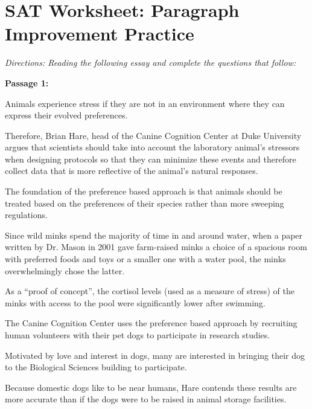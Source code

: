 \section{SAT Worksheet: Paragraph Improvement Practice}

\textit{Directions: Reading the following essay and complete the questions that follow:}

\bigskip
\textbf{Passage 1:}

\bigskip
\begin{inparaenum}[\bfseries 1]
\indent \item Animals experience stress if they are not in an environment where they can express their evolved preferences. \item Therefore, Brian Hare, head of the Canine Cognition Center at Duke University argues that scientists should take into account the laboratory animal's stressors when designing protocols so that they can minimize these events and therefore collect data that is more reflective of the animal's natural responses. \item The foundation of the preference based approach is that animals should be treated based on the preferences of their species rather than more sweeping regulations. \item Since wild minks spend the majority of time in and around water, when a paper written by Dr. Mason in 2001 gave farm-raised minks a choice of a spacious room with preferred foods and toys or a smaller one with a water pool, the minks overwhelmingly chose the latter. \item As a ``proof of concept'', the cortisol levels (used as a measure of stress) of the minks with access to the pool were significantly lower after swimming.

\indent \item The Canine Cognition Center uses the preference based approach by recruiting human volunteers with their pet dogs to participate in research studies. \item Motivated by love and interest in dogs, many are interested in bringing their dog to the Biological Sciences building to participate. \item Because domestic dogs like to be near humans, Hare contends these results are more accurate than if the dogs were to be raised in animal storage facilities. 


\end{inparaenum}
